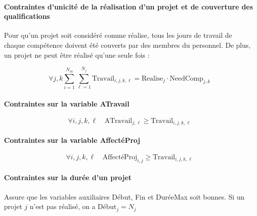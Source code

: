 \documentclass[12pt, a4paper, english, version=last, parskip=half, titlepage]{scrartcl}
\begin{document}


\paragraph{Contraintes d’unicité de la réalisation d’un projet et de couverture des qualifications}
Pour qu'un projet soit considéré comme réalise, tous les jours de travail de chaque compétence doivent été couverts par des membres du personnel. De plus, un projet ne peut être réalisé qu'une seule fois :

\begin{equation*}
    \forall j,k \sum_{i=1}^{N_m} \sum_{\ell=1}^{N_j} \text{Travail}_{i,j,k,\ell} = \text{Realise}_{j}\cdot\text{NeedComp}_{j,k}
\end{equation*}

\paragraph{Contraintes sur la variable ATravail}
\begin{equation*}
    \forall i,j,k,\ell \quad \text{ATravail}_{j,\ell} \ge \text{Travail}_{i,j,k,\ell}
\end{equation*}

\paragraph{Contraintes sur la variable AffectéProj}
\begin{equation*}
    \forall i,j,k,\ell \quad \text{AffectéProj}_{i,j} \ge \text{Travail}_{i,j,k,\ell}
\end{equation*}

\paragraph{Contraintes sur la durée d'un projet}
Assure que les variables auxiliaires Début, Fin et DuréeMax soit bonnes.
Si un projet $j$ n'est pas réalisé, on a $\text{Début}_j = N_j$ %
\end{document}
